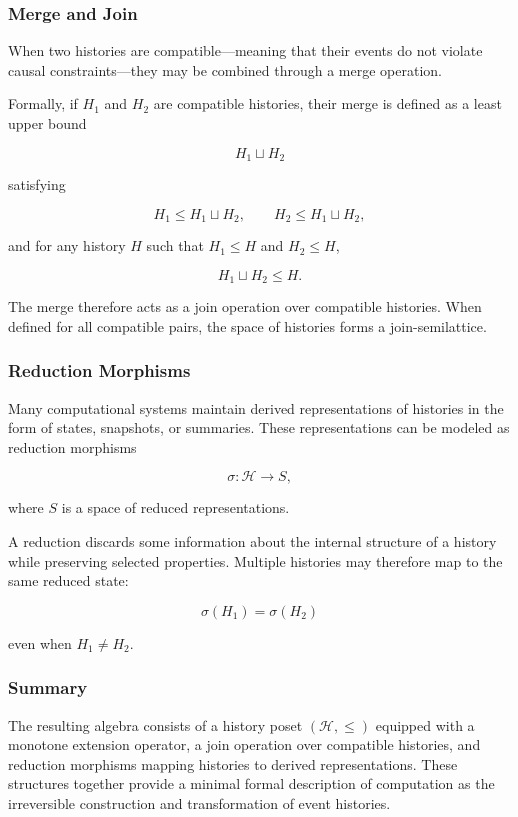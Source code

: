 \documentclass[12pt]{article}
\begin{document}
\subsubsection{Merge and Join}

When two histories are compatible—meaning that their
events do not violate causal constraints—they may be
combined through a merge operation.

Formally, if $H_1$ and $H_2$ are compatible histories,
their merge is defined as a least upper bound

\[
H_1 \sqcup H_2
\]

satisfying

\[
H_1 \leq H_1 \sqcup H_2, \qquad
H_2 \leq H_1 \sqcup H_2,
\]

and for any history $H$ such that
$H_1 \leq H$ and $H_2 \leq H$,

\[
H_1 \sqcup H_2 \leq H.
\]

The merge therefore acts as a join operation over
compatible histories. When defined for all compatible
pairs, the space of histories forms a join-semilattice.

\subsubsection{Reduction Morphisms}

Many computational systems maintain derived representations
of histories in the form of states, snapshots, or summaries.
These representations can be modeled as reduction morphisms

\[
\sigma : \mathcal{H} \rightarrow S,
\]

where $S$ is a space of reduced representations.

A reduction discards some information about the internal
structure of a history while preserving selected properties.
Multiple histories may therefore map to the same reduced
state:

\[
\sigma(H_1) = \sigma(H_2)
\]

even when $H_1 \neq H_2$.

\subsubsection{Summary}

The resulting algebra consists of a history poset
$(\mathcal{H}, \leq)$ equipped with a monotone extension
operator, a join operation over compatible histories,
and reduction morphisms mapping histories to derived
representations. These structures together provide a
minimal formal description of computation as the
irreversible construction and transformation of
event histories.
\end{document}
